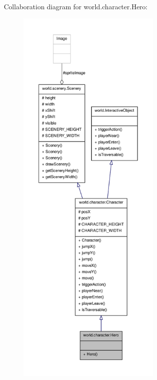 Collaboration diagram for world.\-character.\-Hero\-:\nopagebreak
\begin{figure}[H]
\begin{center}
\leavevmode
\includegraphics[height=550pt]{classworld_1_1character_1_1_hero__coll__graph}
\end{center}
\end{figure}
